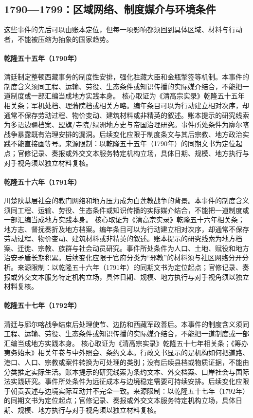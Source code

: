 \subsection{1790—1799：区域网络、制度媒介与环境条件}
这些事件的先后可以由账本定位，但每一项影响都须回到具体区域、材料与行动者，不能被压缩为抽象的国家趋势。
\hypertarget{civic:EQ-1790-IMPERIAL-REGULATIONS-TIBET}{}\paragraph{乾隆五十五年（1790年）}清廷制定整顿西藏事务的制度性安排，强化驻藏大臣和金瓶掣签等机制。本事件的制度含义须同工程、运输、劳役、生态条件或知识传播的实际媒介结合，不能把一道制度或一部汇编当成地方实践本身。 核心取证为《清高宗实录》乾隆五十五年相关条；军机处档、理藩院档或相关方略。编年条目可以为行动建立相对次序，却通常不保存劳动过程、物价变动、建筑材料或非精英的叙述。账本提示的研究线索为多语边疆档案、盟旗/寺院/绿洲地方史与帝国治理研究。事件所处条件为廓尔喀战争暴露既有治理安排的漏洞。后续变化应限于制度条文与其后宗教、地方政治实践不能直接画等号。来源限制：以乾隆五十五年（1790年）的同期文书为定位起点；官修记录、奏报或外交文本服务特定机构立场，具体日期、规模、地方执行与对手视角须以独立材料复核。
\hypertarget{civic:EQ-1791-WHITE-LOTUS-PRECURSORS}{}\paragraph{乾隆五十六年（1791年）}川楚陕基层社会的教门网络和地方压力成为白莲教战争的背景。本事件的制度含义须同工程、运输、劳役、生态条件或知识传播的实际媒介结合，不能把一道制度或一部汇编当成地方实践本身。 核心取证为《清高宗实录》乾隆五十六年相关条；地方志、督抚奏折及地方档案。编年条目可以为行动建立相对次序，却通常不保存劳动过程、物价变动、建筑材料或非精英的叙述。账本提示的研究线索为地方档案、迁徙、宗教、族群与社会动员研究。事件所处条件为人口、土地、赋役和地方治安矛盾长期积累。后续变化应限于官府分类为“邪教”的材料须与社区网络分开分析。来源限制：以乾隆五十六年（1791年）的同期文书为定位起点；官修记录、奏报或外交文本服务特定机构立场，具体日期、规模、地方执行与对手视角须以独立材料复核。
\hypertarget{civic:EQ-1792-GURKHA-SETTLEMENT}{}\paragraph{乾隆五十七年（1792年）}清廷与廓尔喀战争结束后处理使节、边防和西藏军政善后。本事件的制度含义须同工程、运输、劳役、生态条件或知识传播的实际媒介结合，不能把一道制度或一部汇编当成地方实践本身。 核心取证为《清高宗实录》乾隆五十七年相关条；《筹办夷务始末》相关年卷与中外照会、条约文本。行政文书显示的是机构如何把道路、港口、人口、宗教或案件转换为可处理的类别；没有后续县档或物质证据，不能由分类推定实际生活。账本提示的研究线索为条约文本、外交档案、口岸社会与国际法实践研究。事件所处条件为远征成本与边境稳定需要可持续安排。后续变化应限于朝贡表述与边境实际互动并不完全一致。来源限制：以乾隆五十七年（1792年）的同期文书为定位起点；官修记录、奏报或外交文本服务特定机构立场，具体日期、规模、地方执行与对手视角须以独立材料复核。
